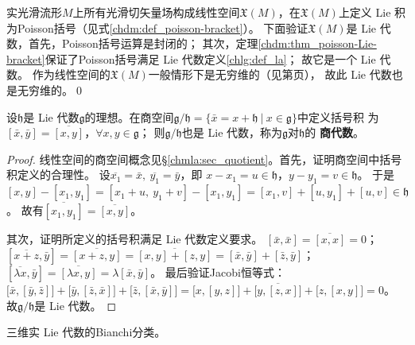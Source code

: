 \begin{example}\label{chlg:exm_LAXM}
    实光滑流形$M$上所有光滑切矢量场构成线性空间$\mathfrak{X}(M)$，在$\mathfrak{X}(M)$上定义
     Lie 积为Poisson括号（见式\eqref{chdm:def_poisson-bracket}）。
    下面验证$\mathfrak{X}(M)$是 Lie 代数，首先，Poisson括号运算是封闭的；
    其次，定理\ref{chdm:thm_poisson-Lie-bracket}保证了Poisson括号满足 Lie 代数定义\ref{chlg:def_la}；
    故它是一个 Lie 代数。
    作为线性空间的$\mathfrak{X}(M)$一般情形下是无穷维的（见第\pageref{chdm:eqn_rnumtimesv}页），
    故此 Lie 代数也是无穷维的。\qed
\end{example}






\begin{proposition}\label{chlg:thm_quotient-algebra}
    设$\mathfrak{h}$是 Lie 代数$\mathfrak{g}$的理想。在{\kaishu 商空间}$\mathfrak{g}/\mathfrak{h}=
    \{\bar{x}=x+\mathfrak{h} \ |\ x\in \mathfrak{g} \}$中定义括号积
    为$[\bar{x},\bar{y}]=\overline{[x,y]}$，$\forall x,y \in \mathfrak{g}$；
    则$\mathfrak{g}/\mathfrak{h}$也是 Lie 代数，称为$\mathfrak{g}$对$\mathfrak{h}$的
    \textbf{商代数}。  
\end{proposition}
\begin{proof}
    线性空间的商空间概念见\S\ref{chmla:sec_quotient}。首先，证明商空间中括号积定义的合理性。
    设$\overline{x_1}=\bar{x},\ \overline{y_1}=\bar{y}$，即
    $x-x_1=u\in \mathfrak{h}$，$y-y_1=v\in \mathfrak{h}$。
    于是$[x,y]-[x_1,y_1]=[x_1+u,\  y_1+v]-[x_1,y_1]=[x_1,v]+[u,y_1]+[u,v]\in \mathfrak{h}$。
    故有$\overline{[x_1,y_1]}=\overline{[x,y]}$。
    
    其次，证明所定义的括号积满足 Lie 代数定义要求。
    $[\bar{x},\bar{x}]=\overline{[x,x]}=0$；
    $[\overline{x+z},\bar{y}]=\overline{[x+z,y]}=\overline{[x,y]+[z,y]}
    =[\bar{x},\bar{y}]+[\bar{z},\bar{y}]$；
    $[\overline{\lambda x},\bar{y}]=\overline{[\lambda x,y]}=\lambda[\bar{x},\bar{y}]$。
    最后验证Jacobi恒等式：
    $\bigl[\bar{x},[\bar{y},\bar{z}]\bigr]+\bigl[\bar{y},[\bar{z},\bar{x}]\bigr]+\bigl[\bar{z},[\bar{x},\bar{y}]\bigr]
    =\overline{\bigl[x,[y,z]\bigr]+\bigl[y,[z,x]\bigr]+\bigl[z,[x,y]\bigr]}=0$。
    故$\mathfrak{g}/\mathfrak{h}$是 Lie 代数。
\end{proof}


\begin{example}
	三维实 Lie 代数的Bianchi分类。
\end{example}

